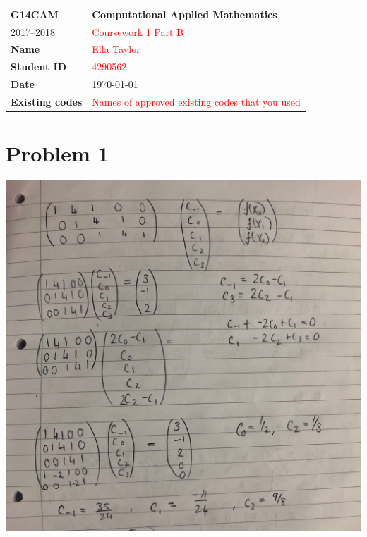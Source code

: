 \documentclass[a4paper,12pt,onecolumn,final]{article}
\begin{document}


\noindent
\begin{tabular}{|p{}|p{}|}
\hline
\textbf{G14CAM} & \textbf{Computational Applied Mathematics}
\\
2017--2018 & \textcolor{red}{Coursework 1 Part B}
\\
\hline
\textbf{Name} & \textcolor{red}{Ella Taylor}
\\ 
\textbf{Student ID} & \textcolor{red}{4290562}
\\ 
\textbf{Date} & \today
\\
\hline
\textbf{Existing codes} & \textcolor{red}{Names of approved existing codes that you used}
\\
\hline
\end{tabular}
\section*{Problem 1}

\includegraphics[scale=0.25]{cw1bQ1.jpg} 
\end{document}

